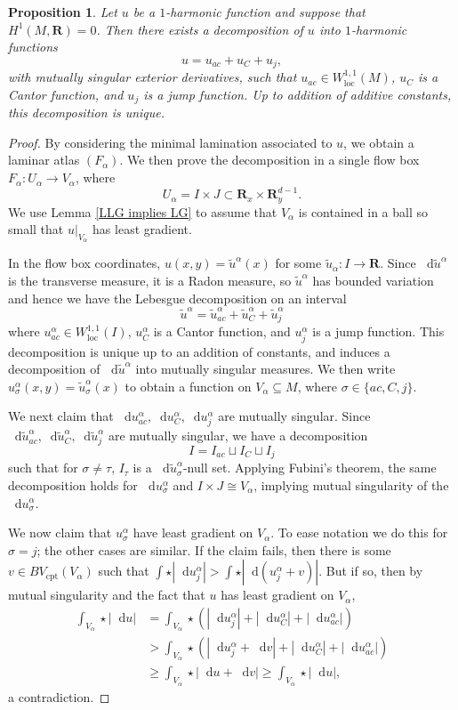 \documentclass[reqno,11pt]{amsart}
\newcommand{\RR}{\mathbf{R}}
\newcommand*\dif{\mathop{}\!\mathrm{d}}
\newcommand{\loc}{\mathrm{loc}}
\newcommand{\cpt}{\mathrm{cpt}}
\newtheorem{proposition}[theorem]{Proposition}
\theoremstyle{definition}
\numberwithin{equation}{section}
\begin{document}
\begin{proposition}
Let $u$ be a $1$-harmonic function and suppose that $H^1(M, \RR) = 0$. Then there exists a decomposition of $u$ into $1$-harmonic functions 
$$u = u_{ac} + u_C + u_j,$$
with mutually singular exterior derivatives, such that $u_{ac} \in W^{1, 1}_\loc(M)$, $u_C$ is a Cantor function, and $u_j$ is a jump function.
Up to addition of additive constants, this decomposition is unique.
\end{proposition}
\begin{proof}
By considering the minimal lamination associated to $u$, we obtain a laminar atlas $(F_\alpha)$.
We then prove the decomposition in a single flow box $F_\alpha: U_\alpha \to V_\alpha$, where
$$U_\alpha = I \times J \subset \RR_x \times \RR^{d - 1}_y.$$
We use Lemma \ref{LLG implies LG} to assume that $V_\alpha$ is contained in a ball so small that $u|_{V_\alpha}$ has least gradient.

In the flow box coordinates, $u(x, y) = \tilde u^\alpha(x)$ for some $\tilde u_\alpha: I \to \RR$. 
Since $\dif \tilde u^\alpha$ is the transverse measure, it is a Radon measure, so $\tilde u^\alpha$ has bounded variation and hence we have the Lebesgue decomposition on an interval \cite[Corollary 3.33]{Ambrosio2000FunctionsOB} 
$$\tilde u^\alpha = \tilde u^\alpha_{ac} + \tilde u^\alpha_C + \tilde u^\alpha_j$$
where $u^\alpha_{ac} \in W^{1, 1}_\loc(I)$, $u^\alpha_C$ is a Cantor function, and $u_j^\alpha$ is a jump function.
This decomposition is unique up to an addition of constants, and induces a decomposition of $\dif \tilde u^\alpha$ into mutually singular measures.
We then write $u^\alpha_\sigma(x, y) = \tilde u^\alpha_\sigma(x)$ to obtain a function on $V_\alpha \subseteq M$, where $\sigma \in \{ac, C, j\}$.

We next claim that $\dif u^\alpha_{ac}, \dif u^\alpha_C, \dif u^\alpha_j$ are mutually singular.
Since $\dif \tilde u^\alpha_{ac}, \dif \tilde u^\alpha_C, \dif \tilde u^\alpha_j$ are mutually singular, we have a decomposition
$$I = I_{ac} \sqcup I_C \sqcup I_j$$
such that for $\sigma \neq \tau$, $I_\tau$ is a $\dif \tilde u^\alpha_\sigma$-null set.
Applying Fubini's theorem, the same decomposition holds for $\dif u^\alpha_\sigma$ and $I \times J \cong V_\alpha$, implying mutual singularity of the $\dif u^\alpha_\sigma$.

We now claim that $u^\alpha_\sigma$ have least gradient on $V_\alpha$.
To ease notation we do this for $\sigma = j$; the other cases are similar.
If the claim fails, then there is some $v \in BV_\cpt(V_\alpha)$ such that $\int \star |\dif u^\alpha_j| > \int \star |\dif (u^\alpha_j + v)|$.
But if so, then by mutual singularity and the fact that $u$ has least gradient on $V_\alpha$,
\begin{align*}
\int_{V_\alpha} \star |\dif u| &= \int_{V_\alpha} \star (|\dif u^\alpha_j| + |\dif u^\alpha_C| + |\dif u^\alpha_{ac}|) \\
&>  \int_{V_\alpha} \star (|\dif u^\alpha_j + \dif v| + |\dif u^\alpha_C| + |\dif u^\alpha_{ac}|) \\
&\geq \int_{V_\alpha} \star |\dif u + \dif v| \geq \int_{V_\alpha} \star |\dif u|,
\end{align*}
a contradiction.


\end{proof}
\end{document}
